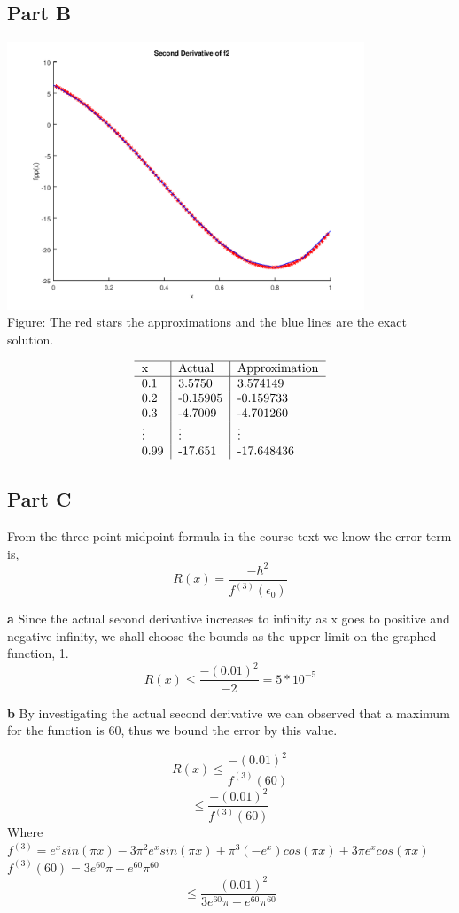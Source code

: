 \documentclass{article}
\begin{document}
\subsection*{Part B}
\includegraphics[height=8cm]{problem4b.png}\\
Figure: The red stars the approximations and the blue lines are the exact solution. 

$$\begin{tabular}{l | l | l } 
	\hline
	x & Actual & Approximation \\
	\hline
	0.1 &  3.5750 & 3.574149 \\
	0.2 & -0.15905 & -0.159733 \\
	0.3 & -4.7009 & -4.701260 \\
	\vdots & \vdots & \vdots \\
	0.99 & -17.651 & -17.648436\\
\end{tabular}$$


\subsection*{Part C}
From the three-point midpoint formula in the course text we know the error term is, 
$$ R(x) = \frac{-h^2}{f^{(3)}(\epsilon_0 )} $$

\textbf{a}
Since the actual second derivative increases to infinity as x goes to positive and negative infinity, we shall choose the bounds as the upper limit on the graphed function, 1. 
$$ R(x) \leq \frac{-(0.01)^2}{-2} = 5*10^{-5}$$

\textbf{b}
By investigating the actual second derivative we can observed that a maximum for the function is 60, thus we bound the error by this value. 

$$ R(x) \leq \frac{-(0.01)^2}{f^{(3)}(60 )} $$
$$  \leq \frac{-(0.01)^2}{f^{(3)}(60 )} $$
Where $f^{(3)} = e^xsin(\pi x)-3 \pi^2 e^x sin(\pi x) + \pi^3 (-e^x)cos(\pi x) + 3 \pi e^x cos(\pi x)$\\
$f^{(3)}(60) = 3e^{60} \pi - e^{60} \pi^{60}$
$$  \leq \frac{-(0.01)^2}{ 3e^{60} \pi - e^{60} \pi^{60} } $$
\end{document}
